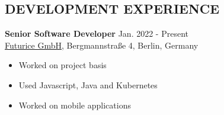 \documentclass[margin, 10pt]{res} %
\begin{document}
\begin{resume}

 
% 





 
 
 
\section{DEVELOPMENT EXPERIENCE}
{\bf Senior Software Developer} \hfill Jan. 2022 - Present\\
\href{https://www.futurice.com}{Futurice GmbH}, Bergmannstra{\ss}e 4, Berlin, Germany 
\begin{itemize}  \itemsep -2pt
  \item Worked on project basis
  \item Used Javascript, Java and Kubernetes
  \item Worked on mobile applications
\end{itemize}



\end{resume}
\end{document}

